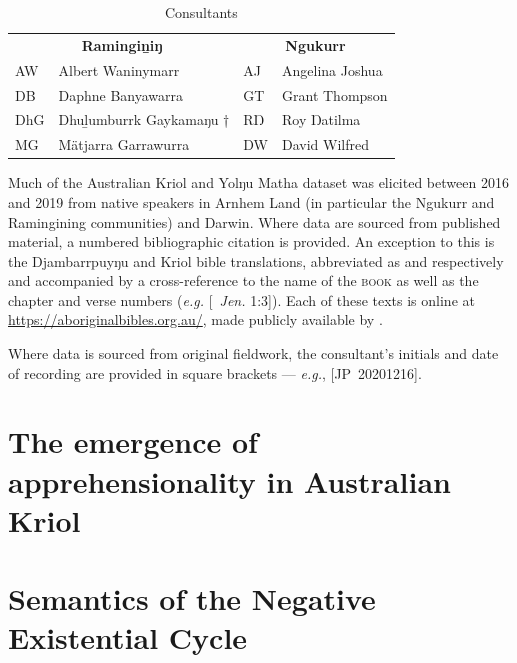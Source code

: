 \documentclass[12pt,dvipsnames]{report}
\begin{document}
\begin{table}\caption{Consultants}
\centering	\begin{tabular}{ll|ll}
	\multicolumn{2}{c}{\textbf{Ramingiṉiŋ}} &	\multicolumn{2}{c}{\textbf{Ngukurr}}\\
	AW& Albert Waninymarr	& AJ & Angelina Joshua\\
	DB & Daphne Banyawarra	& GT & Grant Thompson\\
	DhG & Dhuḻumburrk Gaykamaŋu † & RŊ & Roy Ŋatilma	\\
	MG & Mätjarra Garrawurra& DW & David Wilfred \\
	\end{tabular}
\end{table}


Much of the Australian Kriol and Yolŋu Matha dataset was elicited between 2016 and 2019 from native speakers in Arnhem Land (in particular the Ngukurr and Ramingining communities) and Darwin. Where data are sourced from published material, a numbered bibliographic citation is provided. An exception to this is the Djambarrpuyŋu and Kriol bible translations, abbreviated as  and  respectively and accompanied by a cross-reference to the name of the \textsc{book} as well as the chapter and verse numbers (\textit{e.g.} [~\textit{Jen.} 1:3]). Each of these texts is online at \url{https://aboriginalbibles.org.au/}, made publicly available by \citet{KB,DB}.

  Where data is sourced from original fieldwork, the consultant's initials and date of recording are provided in square brackets --- \textit{e.g.}, [JP~20201216].

\part{The emergence of apprehensionality in Australian Kriol}\label{bambai}
 



%

\part{Semantics of the Negative Existential Cycle}\label{NEC}
\end{document}
